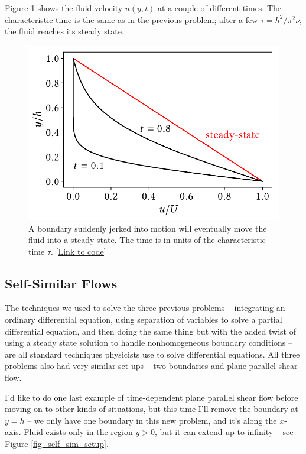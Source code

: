 Figure \ref{fig_poise_imp} shows the fluid velocity $u(y,t)$ at a couple of different times.  The characteristic time is the same as in the previous problem; after a few $\tau = h^2/\pi^2 \nu$, the fluid reaches its steady state.


\begin{figure}
\centering
\includegraphics[width=0.7\linewidth]{Figures/Chapter2/fig_poise_imp}
\caption{A boundary suddenly jerked into motion will eventually move the fluid into a steady state.  The time is in units of the characteristic time $\tau$. \href{https://nbviewer.jupyter.org/github/josephmacmillan/IntroFluidDynamics/blob/master/Jupyter/2-ViscousFluids.ipynb\#Figure-2.3:-An-impulsively-moved-boudary}{[Link to code]}}
\label{fig_poise_imp}
\end{figure}




\subsection{Self-Similar Flows}
\label{sec_self_similar}

The techniques we used to solve the three previous problems -- integrating an ordinary differential equation, using separation of variables to solve a partial differential equation, and then doing the same thing but with the added twist of using a steady state solution to handle nonhomogeneous boundary conditions -- are all standard techniques physicists use to solve differential equations.  All three problems also had very similar set-ups -- two boundaries and plane parallel shear flow.

I'd like to do one last example of time-dependent plane parallel shear flow before moving on to other kinds of situations, but this time I'll remove the boundary at $y=h$ -- we only have one boundary in this new problem, and it's along the $x$-axis.  Fluid exists only in the region $y>0$, but it can extend up to infinity -- see Figure \ref{fig_self_sim_setup}.

